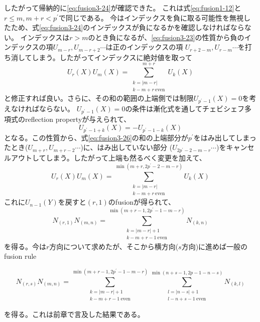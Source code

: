 \documentclass[11pt, aps, longbibliography]{article}
\numberwithin{equation}{section}
\begin{document}
        したがって帰納的に\eqref{eq:fusion3-24}が確認できた。        
        これは式\eqref{eq:fusion1-12}と$r\leq m, m+r<p^\prime$で同じである。
        今はインデックスを負に取る可能性を無視したため、式\eqref{eq:fusion3-24}のインデックスが負になるかを確認しなければならない。
        インデックスは$r>m$のとき負になるが、\eqref{eq:fusion3-23}の性質から負のインデックスの項$U_{m-r},U_{m-r+2}\cdots$は正のインデックスの項
        $U_{r+2-m}, U_{r-m}\cdots$を打ち消してしまう。したがってインデックスに絶対値を取って
        \begin{equation}\label{eq:fusion3-26}
            U_r(X)U_m(X) = \sum_{\substack{k=|m-r| \\ k-m+r \ \text{even}}}^{m+r} U_k(X)
        \end{equation}
        と修正すれば良い。さらに、その和の範囲の上端側では制限$U_{p^\prime-1}(X)=0$を考えなければならない。
        $U_{p^\prime-1}(X)=0$の条件は漸化式を通してチェビシェフ多項式のreflection propertyが与えられて、
        \begin{equation}\label{eq:fusion3-27}
            U_{p^\prime -1+k}(X) = -U_{p^\prime-1-k}(X)
        \end{equation}
        となる。この性質から、式\eqref{eq:fusion3-26}の和の上端部分が$p^\prime$をはみ出してしまったとき($U_{m+r},U_{m+r-2}\cdots$)に、はみ出していない部分
        ($U_{2p^\prime-2-m-r}\cdots$)をキャンセルアウトしてしまう。したがって上端も然るべく変更を加えて、
        \begin{equation}\label{eq:fusion3-28}
            U_r(X)U_m(X) = \sum_{\substack{k=|m-r| \\ k-m+r \ \text{even}}}^{\min (m+r,2p^\prime-2-m-r)} U_k(X)
        \end{equation}
        これに$U_{n-1}(Y)$を戻すと$(r,1)$のfusionが得られて、
        \begin{equation}\label{eq:fusion3-29}
            N_{(r,1)}N_{(m,n)} = \sum_{\substack{k=|m-r|+1 \\ k-m+r-1 \ \text{even}}}^{\min (m+r-1,2p^\prime-1-m-r)} N_{(k,n)}
        \end{equation}
        を得る。今は$r$方向について求めたが、そこから横方向($s$方向)に進めば一般のfusion rule
        \begin{tcolorbox}
            \begin{equation}\label{eq:fusion3-30}
                N_{(r,s)}N_{(m,n)} = \sum_{\substack{k=|m-r|+1 \\ k-m+r-1 \ \text{even}}}^{\min (m+r-1,2p^\prime-1-m-r)}\sum_{\substack{l=|n-s|+1 \\ l-n+s-1 \ \text{even}}}^{\min (n+s-1,2p-1-n-s)} N_{(k,l)}
            \end{equation}
        \end{tcolorbox}
        を得る。これは前章で言及した結果である。
\end{document}
